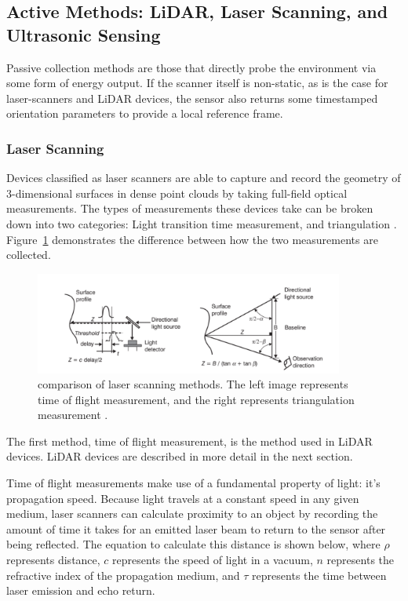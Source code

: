 \documentclass[12pt]{drexelthesis}
\let\Oldsubsection\subsection
\renewcommand{\subsection}{\FloatBarrier\Oldsubsection}
\let\Oldsubsubsection\subsubsection
\renewcommand{\subsubsection}{\FloatBarrier\Oldsubsubsection}
\begin{document}
\subsection{Active Methods: LiDAR, Laser Scanning, and Ultrasonic Sensing}
\label{subsec:active}
Passive collection methods are those that directly probe the environment via some form of energy output. If the scanner itself is non-static, as is the case for laser-scanners and LiDAR devices, the sensor also returns some timestamped orientation parameters to provide a local reference frame.

\subsubsection{Laser Scanning}
Devices classified as laser scanners are able to capture and record the geometry of 3-dimensional surfaces in dense point clouds by taking full-field optical measurements. The types of measurements these devices take can be broken down into two categories: Light transition time measurement, and triangulation \cite{basic-measurement-principles}. Figure~\ref{laserscanners} demonstrates the difference between how the two measurements are collected.

\begin{figure}
	\centering
		\includegraphics[width=4in]{instruments/laser-scanning-methods.png}
		\caption[Comparison of laser scanning methods]{\centering comparison of laser scanning methods. The left image represents time of flight measurement, and the right represents triangulation measurement \cite{basic-measurement-principles}.}
	\label{laserscanners}
\end{figure}

The first method, time of flight measurement, is the method used in LiDAR devices. LiDAR devices are described in more detail in the next section.

Time of flight measurements make use of a fundamental property of light: it's propagation speed. Because light travels at a constant speed in any given medium, laser scanners can calculate proximity to an object by recording the amount of time it takes for an emitted laser beam to return to the sensor after being reflected. The equation to calculate this distance is shown below, where $\rho$ represents distance, $c$ represents the speed of light in a vacuum, $n$ represents the refractive index of the propagation medium, and $\tau$ represents the time between laser emission and echo return.
\end{document}
